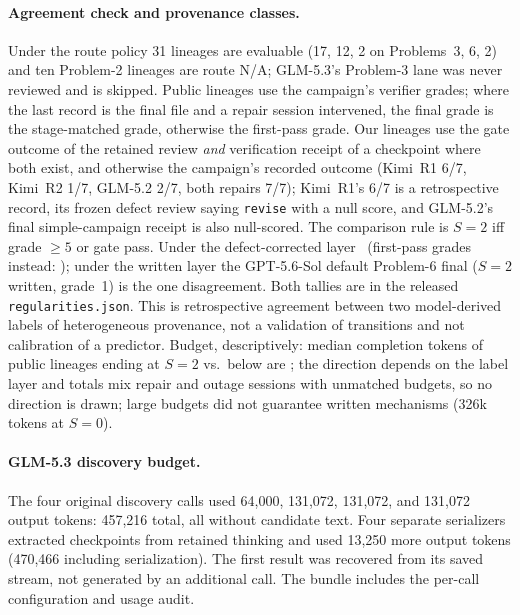 \paragraph{Agreement check and provenance classes.} Under the route policy 31 lineages are evaluable (17, 12, 2 on Problems~3, 6, 2) and ten Problem-2 lineages are route N/A; GLM-5.3's Problem-3 lane was never reviewed and is skipped. Public lineages use the campaign's verifier grades; where the last record is the final file and a repair session intervened, the final grade is the stage-matched grade, otherwise the first-pass grade. Our lineages use the gate outcome of the retained review \emph{and} verification receipt of a checkpoint where both exist, and otherwise the campaign's recorded outcome (Kimi~R1 6/7, Kimi~R2 1/7, GLM-5.2 2/7, both repairs 7/7); Kimi~R1's 6/7 is a retrospective record, its frozen defect review saying \texttt{revise} with a null score, and GLM-5.2's final simple-campaign receipt is also null-scored. The comparison rule is $S{=}2$ iff grade $\ge5$ or gate pass. Under the defect-corrected layer \AGREETXT\ (first-pass grades instead: \AGREEFP); under the written layer the GPT-5.6-Sol default Problem-6 final ($S{=}2$ written, grade~1) is the one disagreement. Both tallies are in the released \texttt{regularities.json}. This is retrospective agreement between two model-derived labels of heterogeneous provenance, not a validation of transitions and not calibration of a predictor. Budget, descriptively: median completion tokens of public lineages ending at $S{=}2$ vs.\ below are \BUDGETTXT; the direction depends on the label layer and totals mix repair and outage sessions with unmatched budgets, so no direction is drawn; large budgets did not guarantee written mechanisms (326k tokens at $S{=}0$).

\paragraph{GLM-5.3 discovery budget.} The four original discovery calls used 64,000, 131,072, 131,072, and 131,072 output tokens: 457,216 total, all without candidate text. Four separate serializers extracted checkpoints from retained thinking and used 13,250 more output tokens (470,466 including serialization). The first result was recovered from its saved stream, not generated by an additional call. The bundle includes the per-call configuration and usage audit.

